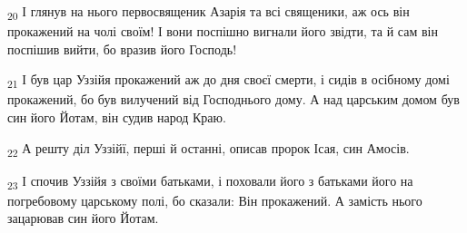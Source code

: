\begin{tcolorbox}
\textsubscript{20} І глянув на нього первосвященик Азарія та всі священики, аж ось він прокажений на чолі своїм! І вони поспішно вигнали його звідти, та й сам він поспішив вийти, бо вразив його Господь!
\end{tcolorbox}
\begin{tcolorbox}
\textsubscript{21} І був цар Уззійя прокажений аж до дня своєї смерти, і сидів в осібному домі прокажений, бо був вилучений від Господнього дому. А над царським домом був син його Йотам, він судив народ Краю.
\end{tcolorbox}
\begin{tcolorbox}
\textsubscript{22} А решту діл Уззійї, перші й останні, описав пророк Ісая, син Амосів.
\end{tcolorbox}
\begin{tcolorbox}
\textsubscript{23} І спочив Уззійя з своїми батьками, і поховали його з батьками його на погребовому царському полі, бо сказали: Він прокажений. А замість нього зацарював син його Йотам.
\end{tcolorbox}

